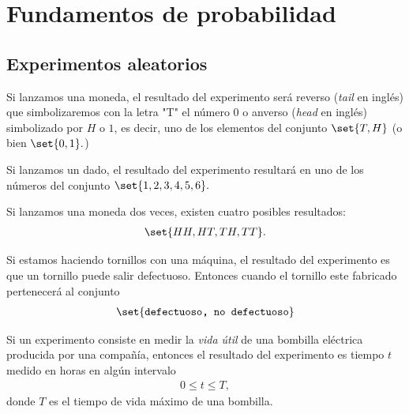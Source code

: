 
\section{Fundamentos de probabilidad}

\subsection{Experimentos aleatorios}

\begin{ejemplo}
	\label{exmp:1.1}
	Si lanzamos una moneda, el resultado del experimento será reverso (\emph{tail} en inglés) que simbolizaremos con la letra "T" el número $0$ o anverso (\emph{head} en inglés) simbolizado por $H$ o $1$, es decir, uno de los elementos del conjunto $\set{T,H}$ (o bien $\set{0,1}.$)
\end{ejemplo}



\begin{ejemplo}
	\label{exmp:1.2}
	Si lanzamos un dado, el resultado del experimento resultará en uno de los números del conjunto $\set{1,2,3,4,5,6}.$
\end{ejemplo}



\begin{ejemplo}
	\label{exmp:1.3}
	Si lanzamos una moneda dos veces, existen cuatro posibles resultados:
	\begin{align*}
		\set{HH,HT,TH,TT}.
	\end{align*}
	
\end{ejemplo}



\begin{ejemplo}
	\label{exmp:1.4}
	Si estamos haciendo tornillos con una máquina, el resultado del experimento es que un tornillo puede salir defectuoso. Entonces cuando el tornillo este fabricado pertenecerá al conjunto
	\begin{align*}
		\set{\texttt{defectuoso, no defectuoso}}
	\end{align*}
	
\end{ejemplo}



\begin{ejemplo}
	\label{exmp:1.5}
	Si un experimento consiste en medir la \emph{vida útil} de una bombilla eléctrica producida por una compañía, entonces el resultado del experimento es tiempo $t$ medido en horas en algún intervalo
	\begin{align*}
		0\leq t \leq T,
	\end{align*}
	donde $T$ es el tiempo de vida máximo de una bombilla.
\end{ejemplo}



